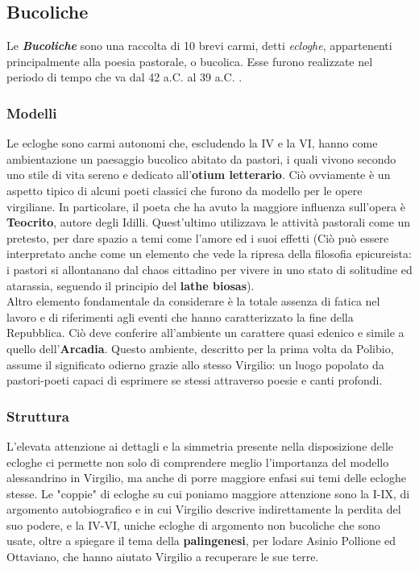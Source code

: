 \documentclass[10pt,a4paper]{article}
\begin{document}
	\subsection*{Bucoliche}
	
	Le \textbf{\textit{Bucoliche}} sono una raccolta di 10 brevi carmi, detti \textit{ecloghe}, appartenenti principalmente alla poesia pastorale, o bucolica. Esse furono realizzate nel periodo di tempo che va dal 42 a.C. al 39 a.C. .\\
	
	\subsubsection*{Modelli}
	
	Le ecloghe sono carmi autonomi che, escludendo la IV e la VI, hanno come ambientazione un paesaggio bucolico abitato da pastori, i quali vivono secondo uno stile di vita sereno e dedicato all'\textbf{otium letterario}. Ciò ovviamente è un aspetto tipico di alcuni poeti classici che furono da modello per le opere virgiliane. In particolare, il poeta che ha avuto la maggiore influenza sull'opera è \textbf{Teocrito}, autore degli Idilli. Quest'ultimo utilizzava le attività pastorali come un pretesto, per dare spazio a temi come l'amore ed i suoi effetti (Ciò può essere interpretato anche come un elemento che vede la ripresa della filosofia epicureista: i pastori si allontanano dal chaos cittadino per vivere in uno stato di solitudine ed atarassia, seguendo il principio del \textbf{lathe biosas}).\\
	
	Altro elemento fondamentale da considerare è la totale assenza di fatica nel lavoro e di riferimenti agli eventi che hanno caratterizzato la fine della Repubblica. Ciò deve conferire all'ambiente un carattere quasi edenico e simile a quello dell'\textbf{Arcadia}. Questo ambiente, descritto per la prima volta da Polibio, assume il significato odierno grazie allo stesso Virgilio: un luogo popolato da pastori-poeti capaci di esprimere se stessi attraverso poesie e canti profondi.
	
	\subsubsection*{Struttura}
	
	L'elevata attenzione ai dettagli e la simmetria presente nella disposizione delle ecloghe ci permette non solo di comprendere meglio l'importanza del modello alessandrino in Virgilio, ma anche di porre maggiore enfasi sui temi delle ecloghe stesse. Le "coppie" di ecloghe su cui poniamo maggiore attenzione sono la I-IX, di argomento autobiografico e in cui Virgilio descrive indirettamente la perdita del suo podere, e la IV-VI, uniche ecloghe di argomento non bucoliche che sono usate, oltre a spiegare il tema della \textbf{palingenesi}, per lodare Asinio Pollione ed Ottaviano, che hanno aiutato Virgilio a recuperare le sue terre.
	
\end{document}
